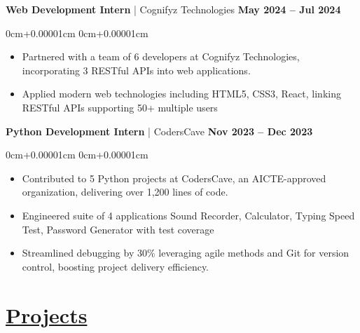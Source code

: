 \documentclass[10pt,a4paper]{article}
\newenvironment{highlights}{
    \begin{itemize}[
        topsep=0.10cm,
        parsep=0.10cm,
        partopsep=0pt,
        itemsep=0pt,
        leftmargin=0cm+10pt
    ]
    }{
    \end{itemize}
}
\newenvironment{onecolentry}{
    \begin{adjustwidth}{
        0cm+0.00001cm
    }{
        0cm+0.00001cm
    }
    }{
    \end{adjustwidth}
}
\begin{document}
    \textbf{Web Development Intern} | Cognifyz Technologies \hfill \textbf{May 2024 -- Jul 2024} \\
    \begin{onecolentry}
        \begin{highlights}
            \vspace{0.01cm}
            \item Partnered with a team of 6 developers at Cognifyz Technologies, incorporating 3 RESTful APIs into web applications.
            \item Applied modern web technologies including HTML5, CSS3, React, linking RESTful APIs supporting 50+ multiple users
        \end{highlights}
    \end{onecolentry}
    \vspace{0.01cm}
    \textbf{Python Development Intern} | CodersCave \hfill \textbf{Nov 2023 -- Dec 2023} \\
    \begin{onecolentry}
        \begin{highlights}
            \vspace{0.01cm}
            \item Contributed to 5 Python projects at CodersCave, an AICTE-approved organization, delivering over 1,200 lines of code.
            \item Engineered suite of 4 applications Sound Recorder, Calculator, Typing Speed Test, Password Generator with test coverage
            \item Streamlined debugging by 30\% leveraging agile methods and Git for version control, boosting project delivery efficiency. \\
        \end{highlights}
    \end{onecolentry}

    \section{\href{https://jefino.is-a.dev/projects}{Projects}}\label{sec:projects}
\end{document}
